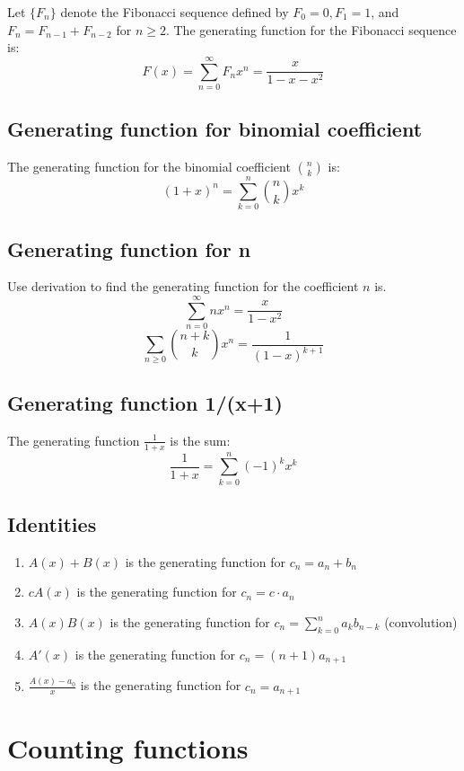 \documentclass{article}
\begin{document}
Let \( \{F_n\} \) denote the Fibonacci sequence defined by \( F_0 = 0, F_1 = 1 \), and \( F_{n} = F_{n-1} + F_{n-2} \) for \( n \geq 2 \). The generating function for the Fibonacci sequence is:
\[ F(x) = \sum_{n=0}^{\infty} F_n x^n = \frac{x}{1 - x - x^2} \]

\subsection{Generating function for binomial coefficient}

The generating function for the binomial coefficient \( \binom{n}{k} \) is:
\[ (1+x)^n = \sum_{k=0}^{n} \binom{n}{k} x^k \]

\subsection{Generating function for n}

Use derivation to find the generating function for the coefficient \( n \) is.
\[ \sum_{n=0}^{\infty} n x^n = \frac{x}{1-x^2} \]
\[ \sum_{n\geq 0} \binom{n+k}{k} x^n = \frac{1}{(1-x)^{k+1}}\]

\subsection{Generating function 1/(x+1)}

The generating function \( \frac{1}{1+x} \) is the sum:
\[ \frac{1}{1+x} = \sum_{k=0}^{n} (-1)^k x^k \]

\subsection{Identities}

\begin{enumerate}
    \item $A(x)+B(x)$ is the generating function for $c_n = a_n+b_n$
    \item $cA(x)$ is the generating function for $c_n = c\cdot a_n$
    \item $A(x)B(x)$ is the generating function for $c_n = \sum_{k=0}^{n} a_k b_{n-k}$ (convolution)
    \item $A'(x)$ is the generating function for $c_n = (n+1) a_{n+1}$
    \item $\frac{A(x)-a_0}{x}$ is the generating function for $c_n = a_{n+1}$
\end{enumerate}

\section{Counting functions}
\end{document}
